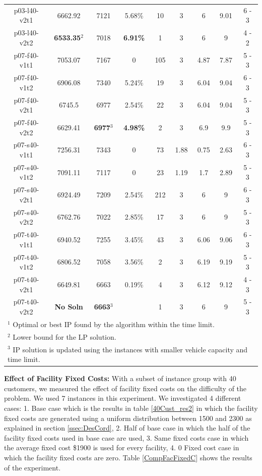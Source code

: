 \begin{table}[h!tbp]
\begin {tabular}[t]{|c|c|c|c|c|c|c|c|c|}
p03-l40-v2t1	&	6662.92	&	7121	&	5.68\%	&	10	&	3	&	6	&	9.01	&	6	-	3	\\
p03-l40-v2t2	&	{\bf 6533.35$^{2}$}	&	7018	&	{\bf 6.91\%}	&	1	&	3	&	6	&	9	&	4	-	2	\\
p07-f40-v1t1	&	7053.07	&	7167	&	0	&	105	&	3	&	4.87	&	7.87	&	5	-	3	\\
p07-f40-v1t2	&	6906.08	&	7340	&	5.24\%	&	19	&	3	&	6.04	&	9.04	&	6	-	3	\\
p07-f40-v2t1	&	6745.5	&	6977	&	2.54\%	&	22	&	3	&	6.04	&	9.04	&	5	-	3	\\
p07-f40-v2t2	&	6629.41	&	{\bf 6977$^{3}$}	&	{\bf 4.98\%}	&	2	&	3	&	6.9	&	9.9	&	5	-	3	\\
p07-s40-v1t1	&	7256.31	&	7343	&	0	&	73	&	1.88	&	0.75	&	2.63	&	6	-	3	\\
p07-s40-v1t2	&	7091.11	&	7117	&	0	&	23	&	1.19	&	1.7	&	2.89	&	5	-	3	\\
p07-s40-v2t1	&	6924.49	&	7209	&	2.54\%	&	212	&	3	&	6	&	9	&	6	-	3	\\
p07-s40-v2t2	&	6762.76	&	7022	&	2.85\%	&	17	&	3	&	6	&	9	&	5	-	3	\\
p07-t40-v1t1	&	6940.52	&	7255	&	3.45\%	&	43	&	3	&	6.06	&	9.06	&	6	-	3	\\
p07-t40-v1t2	&	6806.52	&	7058	&	3.56\%	&	2	&	3	&	6.19	&	9.19	&	5	-	3	\\
p07-t40-v2t1	&	6649.81	&	6663	&	0.19\%	&	4	&	3	&	6.12	&	9.12	&	4	-	3	\\
p07-t40-v2t2	&	{\bf No Soln}	&	{\bf 6663$^{3}$}	&	\mbox{}	&	1	&	3	&	6	&	9	&	5	-	3	\\\hline
\multicolumn{9}{l}{$^{1}$ Optimal or best IP found by the algorithm within the time limit.}\\
\multicolumn{9}{l}{$^{2}$ Lower bound for the LP solution.}\\
\multicolumn{9}{l}{$^{3}$ IP solution is updated using the instances with smaller vehicle capacity and time limit.}\\

\end{tabular}
\end{table}  

{\bf Effect of Facility Fixed Costs:} With a subset of  instance group with 40 customers, we measured the
effect of facility fixed costs on the difficulty of the problem. We used 7 instances in this experiment. 
We investigated 4 different cases: 1. Base case which is the results in table \ref{40Cust_res2} in
which the facility fixed costs are generated using a uniform distribution between 1500 and 2300 as explained
in section \ref{ssec:DesCord}, 2. Half of base case in which the half of the facility fixed costs used in base case
are used, 3. Same fixed costs case in which the average fixed cost \$1900 is used for every facility, 
4. 0 Fixed cost case in which the facility fixed costs are zero. Table \ref{CompFacFixedC} shows
the results of the experiment. 
 
